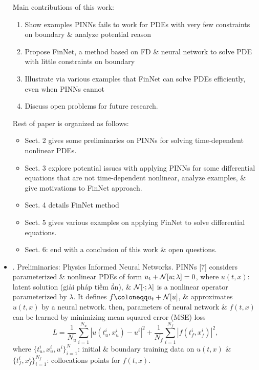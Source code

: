 \documentclass{article}
\begin{document}
\begin{itemize}
	Main contributions of this work:
	\begin{enumerate}
		\item Show examples PINNs fails to work for PDEs with very few constraints on boundary \& analyze potential reason
		\item Propose FinNet, a method based on FD \& neural network to solve PDE with little constraints on boundary
		\item Illustrate via various examples that FinNet can solve PDEs efficiently, even when PINNs cannot
		\item Discuss open problems for future research.
	\end{enumerate}
	Rest of paper is organized as follows:
	\begin{itemize}
		\item Sect. 2 gives some preliminaries on PINNs for solving time-dependent nonlinear PDEs.
		\item Sect. 3 explore potential issues with applying PINNs for some differential equations that are not time-dependent nonlinear, analyze examples, \& give motivations to FinNet approach.
		\item Sect. 4 details FinNet method
		\item Sect. 5 gives various examples on applying FinNet to solve differential equations.
		\item Sect. 6: end with a conclusion of this work \& open questions.
	\end{itemize}
	\item {. Preliminaries: Physics Informed Neural Networks.} PINNs [7] considers parameterized \& nonlinear PDEs of form $u_t + {\cal N}[u;\lambda] = 0$, where $u(t,x)$: latent solution (giải pháp tiềm ẩn), \& ${\cal N}[\cdot;\lambda]$ is a nonlinear operator parameterized by $\lambda$. It defines $f\coloneqq u_t + {\cal N}[u]$, \& approximates $u(t,x)$ by a neural network. then, parameters of neural network \& $f(t,x)$ can be learned by minimizing mean squared error (MSE) loss
	\begin{equation*}
		L = \frac{1}{N_u}\sum_{i=1}^{N_u} |u(t_u^i,x_u^i) - u^i|^2 + \frac{1}{N_f}\sum_{i=1}^{N_f} |f(t_f^i,x_f^i)|^2,
	\end{equation*}
	where $\{t_u^i,x_u^i,u^i\}_{i=1}^N$: initial \& boundary training data on $u(t,x)$ \& $\{t_f^i,x_f^i\}_{i=1}^{N_f}$: collocations points for $f(t,x)$.
	

\end{itemize}
\end{document}
